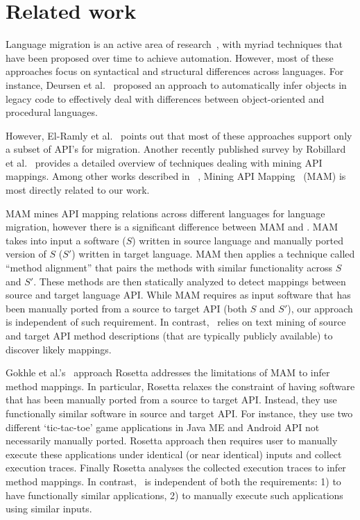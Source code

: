 \section{Related work}
\label{sec:related}

Language migration is an active area of research~\cite{Hassan2005LAM,Mossienko2003ACJ,vanDeursen1999ICSE,WatersIEEEtranSE88,Zhong2010ICSE,Gokhale2013ICSE,nguyen2014statistical}, with myriad techniques that have been proposed over time to achieve automation. However, most of these approaches focus on syntactical and structural differences across languages. For instance, Deursen et al.~\cite{vanDeursen1999ICSE} proposed an approach to automatically infer objects in legacy code to effectively deal with differences between object-oriented and procedural languages.

However, El-Ramly et al.~\cite{Ramly2006CSA} points out that most of these approaches support only a subset of API's for migration. Another recently published survey by Robillard et al.~\cite{RobillardIEEEtranSE13} provides a detailed overview of techniques dealing with mining API mappings. Among other works described in ~\cite{RobillardIEEEtranSE13}, Mining API Mapping~\cite{Zhong2010ICSE} (MAM) is most directly related to our work.


MAM mines API mapping relations across different languages for language migration,
however there is a significant difference between MAM and \tool.
MAM takes into input a software ($S$) written in source language and manually ported version of $S$ ($S'$) written in target language.
MAM then applies a technique called ``method alignment'' that pairs the methods with similar functionality across $S$ and $S'$. These methods are then statically analyzed to detect mappings between source and target language API. While MAM requires as input software that has been manually ported from a source to target API (both $S$ and $S'$), our approach is independent of such requirement.
In contrast, \tool\ relies on text mining of source and target API method descriptions (that are typically publicly available) to discover likely mappings. %


Gokhle et al.'s~\cite{Gokhale2013ICSE} approach Rosetta addresses
the limitations of MAM to infer method mappings.
In particular, Rosetta relaxes the constraint of having 
software that has been manually ported from a source to target API.
Instead, they use functionally similar software in source and target API.
For instance, they use two different `tic-tac-toe' game applications in Java ME and Android API not necessarily manually ported.
Rosetta approach then requires user to manually execute these applications under identical (or near identical) inputs and collect execution traces.
Finally Rosetta analyses the collected execution traces to infer method mappings.
In contrast, \tool\ is independent of both the requirements: 1) to have functionally similar applications, 2) to manually execute such applications using similar inputs.



